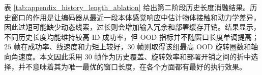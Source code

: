 \begin{table}[htbp]
    \centering
    \ablationcompacttable
    \caption{技能先验中间表征消融结果}
    \label{tab:appendix_direct_priv_ablation}
\end{table}

表 \ref{tab:appendix_history_length_ablation} 给出第二阶段历史长度消融结果。历史窗口的作用是让编码器从最近一段本体感觉响应中估计物体接触和动力学差异，因此过短可能缺少动态线索，过长则会增加输入冗余和部署缓存开销。结果显示，不同历史长度均能维持较高 ID 成功率，但 OOD 指标并不随窗口长度单调提高；\(25\) 帧在成功率、线速度和力矩上较好，\(30\) 帧则取得该组最高 OOD 旋转圈数和轴向角速度。本文因此采用 \(30\) 帧作为历史覆盖、旋转效率和部署开销之间的折中选择，并不意味着其为唯一最优的窗口长度，在各个方面都有最好的执行效果。

